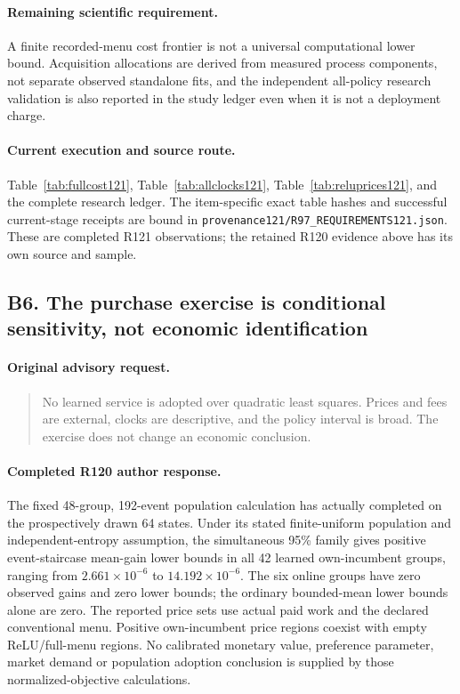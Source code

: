\paragraph{Remaining scientific requirement.}
A finite recorded-menu cost frontier is not a universal computational lower bound. Acquisition allocations are derived from measured process components, not separate observed standalone fits, and the independent all-policy research validation is also reported in the study ledger even when it is not a deployment charge.

\paragraph{Current execution and source route.}
Table~\ref{tab:fullcost121}, Table~\ref{tab:allclocks121}, Table~\ref{tab:reluprices121}, and the complete research ledger.
The item-specific exact table hashes and successful current-stage receipts are bound in \nolinkurl{provenance121/R97_REQUIREMENTS121.json}. These are completed R121 observations; the retained R120 evidence above has its own source and sample.

\subsection{B6. The purchase exercise is conditional sensitivity, not economic identification}
\label{response121:B6}

\paragraph{Original advisory request.}
\begin{quote}
No learned service is adopted over quadratic least squares. Prices and fees are external, clocks are descriptive, and the policy interval is broad. The exercise does not change an economic conclusion.
\end{quote}

\paragraph{Completed R120 author response.}
The fixed 48-group, 192-event population calculation has actually completed on the prospectively drawn 64 states. Under its stated finite-uniform population and independent-entropy assumption, the simultaneous 95\% family gives positive event-staircase mean-gain lower bounds in all 42 learned own-incumbent groups, ranging from $2.661\times10^{-6}$ to $14.192\times10^{-6}$. The six online groups have zero observed gains and zero lower bounds; the ordinary bounded-mean lower bounds alone are zero. The reported price sets use actual paid work and the declared conventional menu. Positive own-incumbent price regions coexist with empty ReLU/full-menu regions. No calibrated monetary value, preference parameter, market demand or population adoption conclusion is supplied by those normalized-objective calculations.

